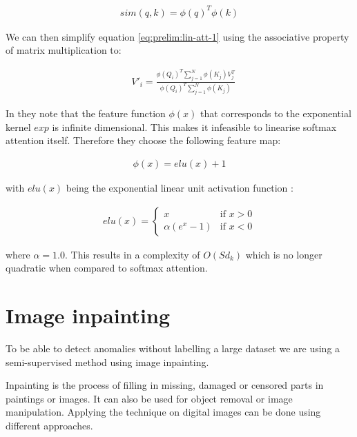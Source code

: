 \begin{align}
sim(q, k) = \phi(q)^T\phi(k)
\end{align}

We can then simplify equation \ref{eq:prelim:lin-att-1} using the associative property of matrix multiplication to:

\begin{align}
    &V'_i = \frac{\phi(Q_i)^T\sum_{j=1}^{N} \phi(K_j)V_j^T}{\phi(Q_i)^T\sum_{j=1}^{N} \phi(K_j)}
\end{align}

In \cite{katharopoulos_transformers_2020} they note that the feature function $\phi(x)$ that corresponds to the exponential kernel $exp$ is infinite dimensional. This makes it infeasible to linearise softmax attention itself. Therefore they choose the following feature map:

\begin{align}
    \phi(x) = elu(x) + 1
\end{align}

with $elu(x)$ being the exponential linear unit activation function \cite{clevert_fast_2015}:

\begin{align}
    elu(x) =     \begin{cases}     \mbox{$x$} & \mbox{if } x > 0\\     \mbox{$\alpha (e^x-1)$} & \mbox{if } x < 0     \end{cases}
\end{align}

where $\alpha = 1.0$. This results in a complexity of $O(S d_k)$ which is no longer quadratic when compared to softmax attention.

\section{Image inpainting}
\label{sec:prelim:image-inpainting}

To be able to detect anomalies without labelling a large dataset we are using a semi-supervised method using image inpainting.

Inpainting is the process of filling in missing, damaged or censored parts in paintings or images. It can also be used for object removal or image manipulation.
Applying the technique on digital images can be done using different approaches.

